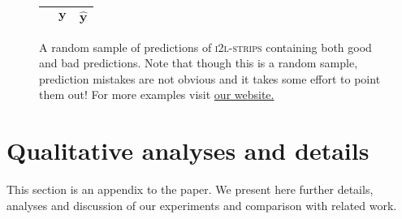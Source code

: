 \begin{figure*}[p]
	\begin{tabular}{lll}
		& $\boldsymbol{y}$ & $\boldsymbol{\hat{y}}$ \\
		\hline
		
	\end{tabular}
	\centering
	\caption[Random Sample of Predictions]{A random sample of predictions of \textsc{i2l-strips} containing both good and bad predictions. Note that though this is a random sample, prediction mistakes are not obvious and it takes some effort to point them out! For more examples visit \href{\website}{our website.}\footnotemark[105]}
	\label{fig-rand-preds}
\end{figure*}

\section{Qualitative analyses and details}
\label{observations}
This section is an appendix to the paper. We present here further details, analyses and discussion of our experiments and comparison with related work.

